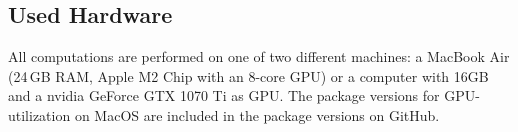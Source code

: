 \subsection{Used Hardware}

All computations are performed on one of two different machines: a MacBook Air (24\,GB RAM, Apple M2 Chip with an 8-core GPU) or a computer with 16GB and a nvidia GeForce GTX 1070 Ti as GPU. The package versions for GPU-utilization on MacOS are included in the package versions on GitHub.

